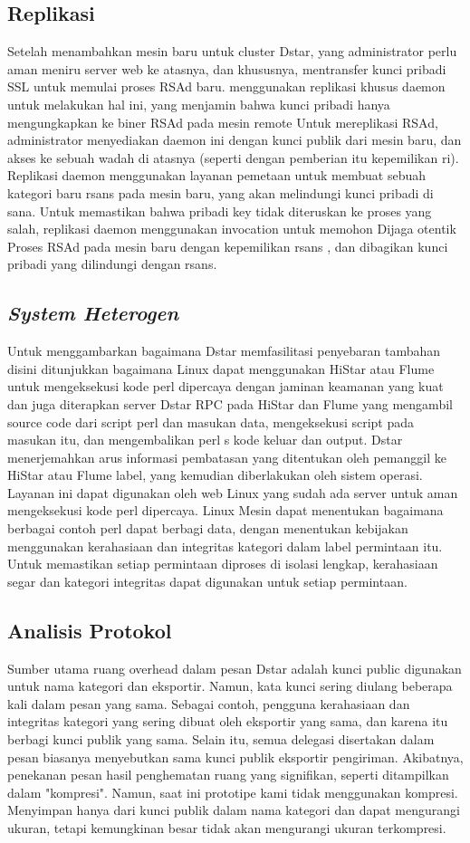 \documentclass{jtetiproposalskripsi}
\begin{document}
\subsection{Replikasi}
Setelah menambahkan mesin baru untuk cluster Dstar, yang administrator perlu aman meniru server web ke atasnya, dan khususnya, mentransfer kunci pribadi SSL untuk memulai proses RSAd baru. menggunakan replikasi khusus daemon untuk melakukan hal ini, yang menjamin bahwa kunci pribadi hanya mengungkapkan ke biner RSAd pada mesin remote Untuk mereplikasi RSAd, administrator menyediakan daemon ini dengan kunci publik dari mesin baru, dan akses ke sebuah wadah di atasnya (seperti dengan pemberian itu kepemilikan ri). Replikasi daemon menggunakan layanan pemetaan untuk membuat sebuah kategori baru rsans pada mesin baru, yang akan  melindungi kunci pribadi di sana. Untuk memastikan bahwa pribadi key tidak diteruskan ke proses yang salah, replikasi daemon menggunakan invocation untuk memohon Dijaga otentik Proses RSAd pada mesin baru dengan kepemilikan rsans , dan dibagikan kunci pribadi yang dilindungi dengan rsans.

\subsection{\emph{System Heterogen}}
Untuk menggambarkan bagaimana Dstar memfasilitasi penyebaran tambahan disini ditunjukkan bagaimana Linux dapat menggunakan HiStar atau Flume untuk mengeksekusi kode perl dipercaya dengan jaminan keamanan yang kuat dan juga diterapkan server Dstar RPC pada HiStar dan Flume yang mengambil source code dari script perl dan masukan data, mengeksekusi script pada masukan itu, dan mengembalikan perl s kode keluar dan output. Dstar menerjemahkan arus informasi pembatasan yang ditentukan oleh pemanggil ke HiStar atau Flume label, yang kemudian diberlakukan oleh sistem operasi. Layanan ini dapat digunakan oleh web Linux yang sudah ada server untuk aman mengeksekusi kode perl dipercaya. Linux Mesin dapat menentukan bagaimana berbagai contoh perl dapat berbagi data, dengan menentukan kebijakan menggunakan kerahasiaan dan integritas kategori dalam label permintaan itu. Untuk memastikan setiap permintaan diproses di isolasi lengkap, kerahasiaan segar dan kategori integritas dapat digunakan untuk setiap permintaan.
\subsection{Analisis Protokol}
Sumber utama ruang overhead dalam pesan Dstar adalah kunci public digunakan untuk nama kategori dan eksportir. Namun, kata kunci sering diulang beberapa kali dalam pesan yang sama. Sebagai contoh, pengguna kerahasiaan dan integritas kategori yang sering dibuat oleh eksportir yang sama, dan karena itu berbagi kunci publik yang sama. Selain itu, semua delegasi disertakan dalam pesan biasanya menyebutkan sama kunci publik eksportir pengiriman. Akibatnya, penekanan pesan hasil penghematan ruang yang signifikan, seperti ditampilkan dalam "kompresi". Namun, saat ini prototipe kami tidak menggunakan kompresi. Menyimpan hanya dari kunci publik dalam nama kategori dan dapat mengurangi ukuran, tetapi kemungkinan besar tidak akan mengurangi ukuran terkompresi.
\end{document}
